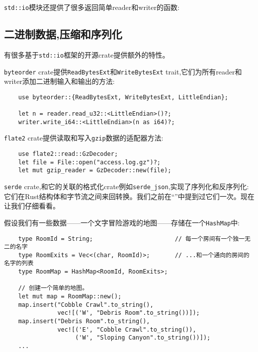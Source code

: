 \texttt{std::io}模块还提供了很多返回简单reader和writer的函数:



\subsection{二进制数据,压缩和序列化}
有很多基于\texttt{std::io}框架的开源crate提供额外的特性。

\texttt{byteorder} crate提供\texttt{ReadBytesExt}和\texttt{WriteBytesExt} trait,它们为所有reader和writer添加二进制输入和输出的方法:
\begin{verbatim}
    use byteorder::{ReadBytesExt, WriteBytesExt, LittleEndian};

    let n = reader.read_u32::<LittleEndian>()?;
    writer.write_i64::<LittleEndian>(n as i64)?;
\end{verbatim}

\texttt{flate2} crate提供读取和写入\texttt{gzip}数据的适配器方法:
\begin{verbatim}
    use flate2::read::GzDecoder;
    let file = File::open("access.log.gz")?;
    let mut gzip_reader = GzDecoder::new(file);
\end{verbatim}

\texttt{serde} crate,和它的关联的格式化crate例如\texttt{serde\_json},实现了序列化和反序列化:它们在Rust结构体和字节流之间来回转换。我们之前在“”中提到过它们一次。现在让我们仔细看看。

假设我们有一些数据——一个文字冒险游戏的地图——存储在一个\texttt{HashMap}中:
\begin{verbatim}
    type RoomId = String;                       // 每一个房间有一个独一无二的名字
    type RoomExits = Vec<(char, RoomId)>;       // ...和一个通向的房间的名字的列表
    type RoomMap = HashMap<RoomId, RoomExits>;

    // 创建一个简单的地图。
    let mut map = RoomMap::new();
    map.insert("Cobble Crawl".to_string(),
               vec![('W', "Debris Room".to_string())]);
    map.insert("Debris Room".to_string(),
               vec![('E', "Cobble Crawl".to_string()),
                    ('W', "Sloping Canyon".to_string())]);
    ...
\end{verbatim}


